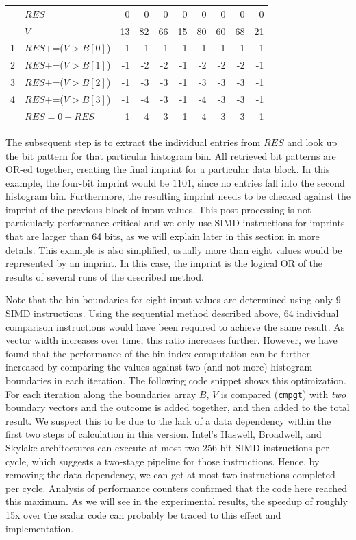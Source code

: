 \documentclass[sigconf]{acmart}
\begin{document}
\bigskip

\begin{tabular}{l|l|rrrrrrrr}
&$RES$             &  0 &  0 & 0 & 0 & 0 & 0 & 0 & 0 \\
&$V$             & 13 & 82 & 66 & 15 & 80 & 60 & 68 & 21 \\
\hline
1&$RES$+=($V$$>$$B[0]$)& -1 & -1 & -1 & -1 & -1 & -1 & -1 & -1 \\
2&$RES$+=($V$$>$$B[1]$)& -1 & -2 & -2 & -1 & -2 & -2 & -2 & -1 \\
3&$RES$+=($V$$>$$B[2]$)& -1 & -3 & -3 & -1 & -3 & -3 & -3 & -1 \\
4&$RES$+=($V$$>$$B[3]$)& -1 & -4 & -3 & -1 & -4 & -3 & -3 & -1 \\
\hline
&$RES=0-RES$&  1 &  4 &  3 &  1 &  4  & 3 &  3 &  1 \\
\end{tabular}

\bigskip

The subsequent step is to extract the individual entries from $RES$ and look up the bit pattern for that particular histogram bin. All retrieved bit patterns are OR-ed together, creating the final imprint for a particular data block. In this example, the four-bit imprint would be $1101$, since no entries fall into the second histogram bin. Furthermore, the resulting imprint needs to be checked against the imprint of the previous block of input values. This post-processing is not particularly performance-critical and we only use SIMD instructions for imprints
that are larger than 64 bits, as we will explain later in this section in more details. This example is also simplified, usually more than
eight values would be represented by an imprint. In this case, the imprint is the logical OR of the results of several runs of the described
method.

Note that the bin boundaries for eight input values are determined using only 9 SIMD instructions. Using the sequential method described above, 64 
individual comparison instructions would have been required to achieve the same result. As vector width increases over time, this ratio increases 
further. However, we have found that the performance of the bin index computation can be further increased by comparing the values against two
(and not more) histogram boundaries in each iteration. The following code snippet shows this optimization. For each iteration along the boundaries
array $B$, $V$ is compared (\texttt{cmpgt}) with \emph{two} boundary vectors and the outcome is added together, and then added to the total result. We suspect this to be due to the lack of a data dependency within the first two steps of calculation in this version. Intel's Haswell, Broadwell, and Skylake architectures can execute at most two 256-bit SIMD instructions per cycle, which suggests a two-stage pipeline for those instructions. Hence, by removing the data dependency, we can get at most two instructions completed per cycle. Analysis of performance counters confirmed that the code here reached this maximum. As we will see in the experimental results, the speedup of roughly 15x over the scalar code can probably be traced to this effect and implementation.
\end{document}
